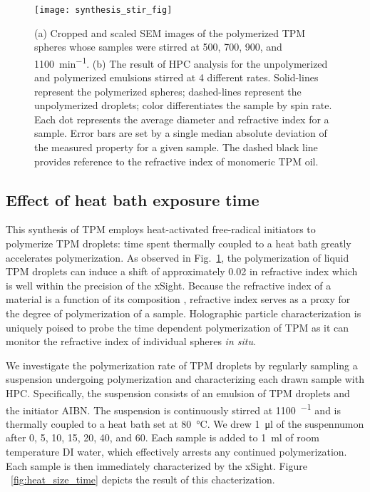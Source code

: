 \begin{figure}
    \centering
    \texttt{[image: synthesis\_stir\_fig]}
    \caption{(a) Cropped and scaled SEM images of the polymerized TPM spheres whose
      samples were stirred at \num{500}, \num{700}, \num{900}, and \SI{1100}{\minute^{-1}}.
      (b)  The result of HPC analysis for the unpolymerized and polymerized
      emulsions stirred at \num{4} different rates. Solid-lines represent the polymerized
      spheres; dashed-lines represent the unpolymerized droplets; color differentiates the sample by
      spin rate. Each dot represents the
      average diameter and refractive index for a sample. Error bars are set by a single
      median absolute deviation of the measured property for a given sample. The dashed
      black line provides reference to the refractive index of monomeric TPM oil.}
    \label{fig:synthesis_stir_rate}
\end{figure}


\subsection{Effect of heat bath exposure time}

This synthesis of TPM employs heat-activated free-radical initiators to polymerize TPM droplets:
time spent thermally coupled to a heat bath greatly accelerates polymerization.
As observed in Fig.~\ref{fig:synthesis_stir_rate}, the polymerization of
liquid TPM droplets can induce a shift of approximately \SI{0.02}{} in refractive index
which is well within the precision of the xSight.  Because the refractive index
of a material is a function of its composition \cite{wang15},
refractive index serves as a proxy for the degree of
polymerization of a sample.  Holographic particle
characterization is uniquely poised to probe the time dependent polymerization of TPM as
it can monitor the refractive index of individual spheres \emph{in situ}.

We investigate the polymerization rate of TPM droplets by regularly sampling a
suspension undergoing polymerization and characterizing each drawn sample with HPC.
Specifically, the suspension consists of an emulsion of TPM droplets
and the initiator AIBN. The suspension is continuously stirred at \SI{1100}{\min^{-1}}
and is thermally coupled to a heat bath set at \SI{80}{\degreeCelsius}.
We drew \SI{1}{\ul} of the suspennumon after \num{0}, \num{5}, \num{10}, \num{15},
\num{20}, \num{40}, and \SI{60}{\min}. Each sample is added to \SI{1}{\ml} of
room temperature DI water, which effectively arrests any continued polymerization.
Each sample is then immediately characterized by the xSight. Figure ~\ref{fig:heat_size_time}
depicts the result of this chacterization.


